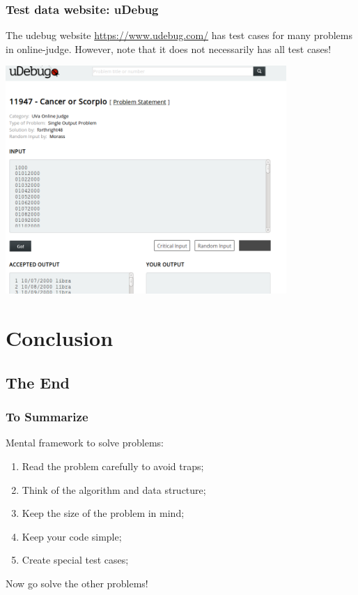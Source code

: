 \begin{frame}
  \frametitle{Test data website: uDebug}
  The udebug website \url{https://www.udebug.com/} has test cases for many problems in online-judge. \alert{However, note that it does not necessarily has all test cases}!
  \bigskip

  \begin{center}
    \includegraphics[width=0.8\textwidth]{../img/udebug_big}
  \end{center}
\end{frame}

\section{Conclusion}
\subsection{The End}
\begin{frame}
  \frametitle{To Summarize}
  Mental framework to solve problems:
  \begin{enumerate}
  \item Read the problem carefully to avoid traps;
  \item Think of the algorithm and data structure;
  \item Keep the size of the problem in mind;
  \item Keep your code simple;
  \item Create special test cases;
  \end{enumerate}

  \vfill

  \begin{block}{}
    Now go solve the other problems!
  \end{block}
\end{frame}


